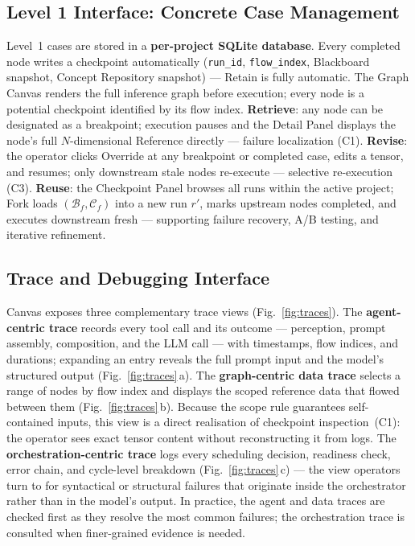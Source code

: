 \subsection{Level 1 Interface: Concrete Case Management}

Level~1 cases are stored in a \textbf{per-project SQLite database}. Every completed
node writes a checkpoint automatically (\texttt{run\_id}, \texttt{flow\_index},
Blackboard snapshot, Concept Repository snapshot) --- Retain is fully automatic. The
Graph Canvas renders the full inference graph before execution; every node is a
potential checkpoint identified by its flow index. \textbf{Retrieve}: any node can be
designated as a breakpoint; execution pauses and the Detail Panel displays the node's
full $N$-dimensional Reference directly --- failure localization (C1). \textbf{Revise}:
the operator clicks Override at any breakpoint or completed case, edits a tensor, and
resumes; only downstream stale nodes re-execute --- selective re-execution (C3).
\textbf{Reuse}: the Checkpoint Panel browses all runs within the active project; Fork
loads $(\mathcal{B}_f, \mathcal{C}_f)$ into a new run $r'$, marks upstream nodes
completed, and executes downstream fresh --- supporting failure recovery, A/B testing,
and iterative refinement.

\subsection{Trace and Debugging Interface}

Canvas exposes three complementary trace views (Fig.~\ref{fig:traces}).
The \textbf{agent-centric trace} records every tool call and its outcome ---
perception, prompt assembly, composition, and the LLM call --- with timestamps,
flow indices, and durations; expanding an entry reveals the full prompt input and
the model's structured output (Fig.~\ref{fig:traces}\,a).
The \textbf{graph-centric data trace} selects a range of nodes by flow index and
displays the scoped reference data that flowed between them
(Fig.~\ref{fig:traces}\,b). Because the scope rule guarantees self-contained
inputs, this view is a direct realisation of checkpoint inspection~(C1): the
operator sees exact tensor content without reconstructing it from logs.
The \textbf{orchestration-centric trace} logs every scheduling decision, readiness
check, error chain, and cycle-level breakdown (Fig.~\ref{fig:traces}\,c) ---
the view operators turn to for syntactical or structural failures that originate
inside the orchestrator rather than in the model's output.
In practice, the agent and data traces are checked first as they resolve the most
common failures; the orchestration trace is consulted when finer-grained evidence
is needed.

